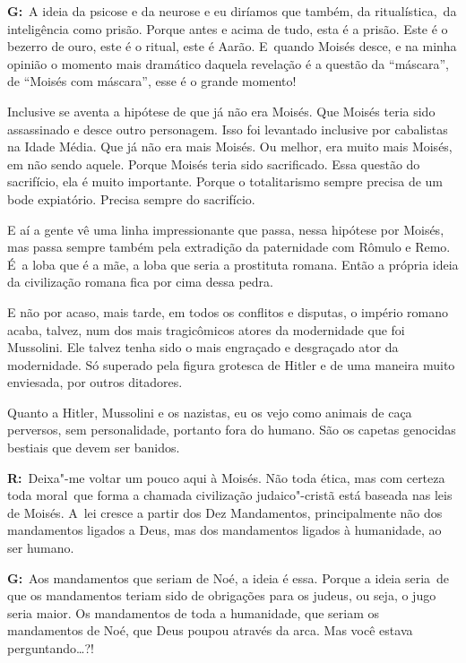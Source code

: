  

\textbf{G:}~A ideia da psicose e da neurose e eu diríamos que também, da
ritualística,\textbf{}~da inteligência como prisão. Porque antes e acima
de tudo, esta é a prisão. Este é o bezerro de ouro, este é o ritual,
este é Aarão. E~quando Moisés desce, e na minha opinião o momento mais
dramático daquela revelação é a questão da ``máscara'', de ``Moisés com
máscara'', esse é o grande momento!

 

Inclusive se aventa a hipótese de que já não era Moisés. Que Moisés
teria sido assassinado e desce outro personagem. Isso foi levantado
inclusive por cabalistas na Idade Média. Que já não era mais Moisés. Ou
melhor, era muito mais Moisés, em não sendo aquele. Porque Moisés teria
sido sacrificado. Essa questão do sacrifício, ela é muito importante.
Porque o totalitarismo sempre precisa de um bode expiatório. Precisa sempre
do sacrifício.

 

E aí a gente vê uma linha impressionante que passa, nessa hipótese por
Moisés, mas passa sempre também pela extradição da paternidade com
Rômulo e Remo. É~a loba que é a mãe, a loba que seria a prostituta
romana. Então a própria ideia da civilização romana fica por cima dessa
pedra.

 

E não por acaso, mais tarde, em todos os conflitos e disputas, o império
romano acaba, talvez, num dos mais tragicômicos atores da modernidade
que foi Mussolini. Ele talvez tenha sido o mais engraçado e desgraçado
ator da modernidade. Só superado pela figura grotesca de Hitler e de uma
maneira muito enviesada, por outros ditadores.

 

Quanto a Hitler, Mussolini e os nazistas, eu os vejo como animais de
caça perversos, sem personalidade, portanto fora do humano. São os
capetas genocidas bestiais que devem ser banidos.

 

\textbf{R:}~Deixa"-me voltar um pouco aqui à Moisés. Não toda ética, mas
com certeza toda moral\textbf{}~que forma a chamada civilização
judaico"-cristã está baseada nas leis de Moisés. A~lei cresce a partir
dos Dez Mandamentos, principalmente não dos mandamentos ligados a Deus,
mas dos mandamentos ligados à humanidade, ao ser humano.

 

\textbf{G:}~Aos mandamentos que seriam de Noé, a ideia é essa. Porque a
ideia seria\textbf{}~de que os mandamentos teriam sido de obrigações
para os judeus, ou seja, o jugo seria maior. Os mandamentos de toda a
humanidade, que seriam os mandamentos de Noé, que Deus poupou através da
arca. Mas você estava perguntando…?!


